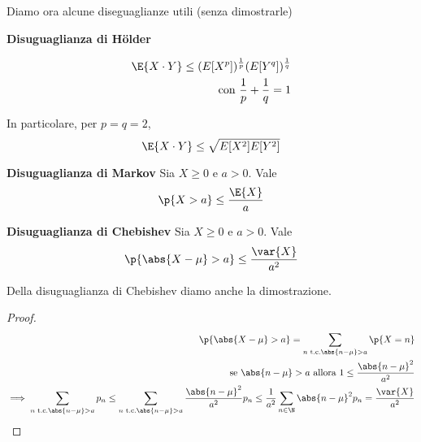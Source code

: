 Diamo ora alcune diseguaglianze utili (senza dimostrarle)



\begin{prop}
	\textbf{Disuguaglianza di H\"older}

    \begin{equation}
        \begin{aligned}
        \E{X \cdot Y} \leq (E[X^p])^{\frac{1}{p}} (E[Y^q])^{\frac{1}{q}} \\
        \text{con } \dfrac{1}{p} + \dfrac{1}{q} = 1
        \end{aligned}
    \end{equation}

    In particolare, per $p=q=2$,
    \begin{equation}
		\E{X \cdot Y} \leq \sqrt{E[X^2]E[Y^2]}
    \end{equation}

\end{prop}

\begin{prop}
    \textbf{Disuguaglianza di Markov}
	Sia $X \geq 0$ e $ a > 0$. Vale
    \begin{equation}
        \p{X > a} \le \dfrac{\E{X}}{a}
    \end{equation}
\end{prop}

\begin{prop}
	\textbf{Disuguaglianza di Chebishev}
	Sia $X \geq 0$ e $ a > 0$. Vale
	\begin{equation}
					\p{\abs{X - \mu} > a} \leq \dfrac{\var{X}}{a^2}
	\end{equation}
\end{prop}
Della disuguaglianza di Chebishev diamo anche la dimostrazione.
\begin{proof}
    \begin{equation*}
        \begin{aligned}
            \p{\abs{X - \mu} > a} = \sum_{n \text{ t.c.} \abs{n - \mu} > a} \p{X = n} \\				\text{se } \abs{n - \mu} > a \text{ allora } 1 \le \dfrac{\abs{n - \mu}^2}{a^2} \\
            \implies  \sum_{n \text{ t.c.} \abs{n - \mu} > a}  p_n
                \leq \sum_{n \text{ t.c.} \abs{n - \mu} > a}  \dfrac{\abs{n - \mu}^2}{a^2} p_n \leq \dfrac{1}{a^2} \sum_{n\in \N} \abs{n - \mu}^2 p_n =\dfrac{\var{X}}{a^2}
        \end{aligned}
    \end{equation*}
\end{proof}

